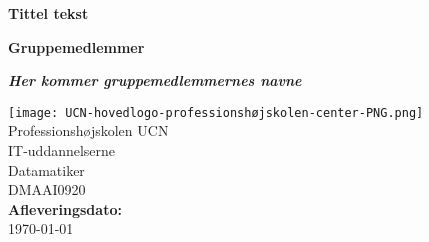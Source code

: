 \begin{titlepage}
    \begin{center}
        \vspace*{1cm}

        \LARGE
        \textbf{Tittel tekst}

        \vspace{1.5cm}

        \large
        \textbf{Gruppemedlemmer}

        \vspace{0.5cm}

        \textbf{
            \emph{
                Her kommer gruppemedlemmernes navne\\
            }
        }

        \vfill

        \normalsize
        \texttt{[image: UCN-hovedlogo-professionshøjskolen-center-PNG.png]}\\
        \vspace{0.1cm}
        Professionshøjskolen UCN\\
        IT-uddannelserne\\
        Datamatiker\\
        DMAAI0920\\
        \vspace{0.5cm}
        \textbf{Afleveringsdato:}\\
        \today
    \end{center}
\end{titlepage}